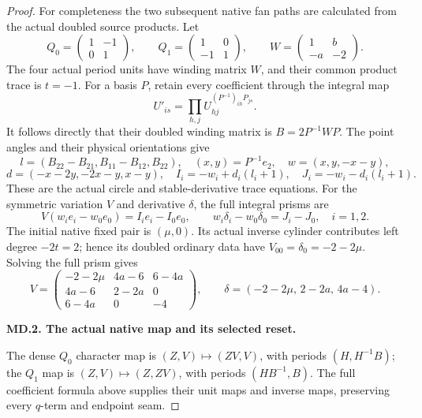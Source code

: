 \begin{proof}
For completeness the two subsequent native fan paths are calculated from the actual doubled source products. Let
\[
 Q_0=\begin{pmatrix}1&-1\\0&1\end{pmatrix},\qquad
 Q_1=\begin{pmatrix}1&0\\-1&1\end{pmatrix},\qquad
 W=\begin{pmatrix}1&b\\-a&-2\end{pmatrix}.
\]
The four actual period units have winding matrix \(W\), and their common product trace is \(t=-1\). For a basis \(P\), retain every coefficient through the integral map
\[
 U'_{is}=\prod_{h,j}U_{hj}^{(P^{-1})_{ih}P_{js}}.
\]
It follows directly that their doubled winding matrix is \(B=2P^{-1}WP\). The point angles and their physical orientations give
\[
 l=(B_{22}-B_{21},B_{11}-B_{12},B_{22}),\quad
 (x,y)=P^{-1}e_2,\quad w=(x,y,-x-y),
\]
\[
 d=(-x-2y,-2x-y,x-y),\quad
 I_i=-w_i+d_i(l_i+1),\quad J_i=-w_i-d_i(l_i+1).
\]
These are the actual circle and stable-derivative trace equations. For the symmetric variation \(V\) and derivative \(\delta\), the full integral prisms are
\[
 V(w_i e_i-w_0e_0)=I_i e_i-I_0e_0,\qquad
 w_i\delta_i-w_0\delta_0=J_i-J_0,\quad i=1,2.
\]
The initial native fixed pair is \((\mu,0)\). Its actual inverse cylinder contributes left degree \(-2t=2\); hence its doubled ordinary data have \(V_{00}=\delta_0=-2-2\mu\). Solving the full prism gives
\[
 V=\begin{pmatrix}
 -2-2\mu&4a-6&6-4a\\
 4a-6&2-2a&0\\6-4a&0&-4
 \end{pmatrix},\qquad
 \delta=(-2-2\mu,\,2-2a,\,4a-4).
\]

\par\medskip\noindent\textbf{MD.2. The actual native map and its selected reset.}\par\nopagebreak[4]

The dense \(Q_0\) character map is \((Z,V)\mapsto(ZV,V)\), with periods \((H,H^{-1}B)\); the \(Q_1\) map is \((Z,V)\mapsto(Z,ZV)\), with periods \((HB^{-1},B)\). The full coefficient formula above supplies their unit maps and inverse maps, preserving every \(q\)-term and endpoint seam.


\end{proof}
